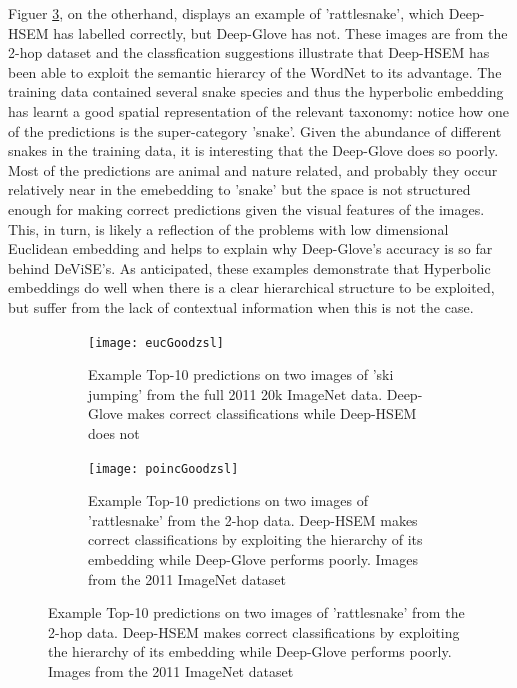\documentclass[12pt]{report}
\begin{document}
Figuer \ref{fig:poincgoodzsl}, on the otherhand, displays an example of 'rattlesnake', which Deep-HSEM has labelled correctly, but Deep-Glove has not. These images are from the 2-hop dataset and the classfication suggestions illustrate that Deep-HSEM has been able to exploit the semantic hierarcy of the WordNet to its advantage. The training data contained several snake species and thus the hyperbolic embedding has learnt a good spatial representation of the relevant taxonomy: notice how one of the predictions is the super-category 'snake'. Given the abundance of different snakes in the training data, it is interesting that the Deep-Glove does so poorly. Most of the predictions are animal and nature related, and probably they occur relatively near in the emebedding to 'snake' but the space is not structured enough for making correct predictions given the visual features of the images. This, in turn, is likely a reflection of the problems with low dimensional Euclidean embedding and helps to explain why Deep-Glove's accuracy is so far behind DeViSE's. As anticipated, these examples demonstrate that Hyperbolic embeddings do well when there is a clear hierarchical structure to be exploited, but suffer from the lack of contextual information when this is not the case.

\begin{figure}
  \centering
  \begin{subfigure}[b]{0.9\textwidth}
  \texttt{[image: eucGoodzsl]}
  \caption{Example Top-10 predictions on two images of 'ski jumping' from the full 2011 20k ImageNet data. Deep-Glove makes correct classifications while Deep-HSEM does not}
  \label{fig:eucgoodzsl}
\end{subfigure}

\begin{subfigure}[b]{0.9\textwidth}
  \texttt{[image: poincGoodzsl]}
  \caption{Example Top-10 predictions on two images of 'rattlesnake' from the 2-hop data. Deep-HSEM makes correct classifications by exploiting the hierarchy of its embedding while Deep-Glove performs poorly. Images from the 2011 ImageNet dataset \cite{JiaDeng2009}}
  \label{fig:poincgoodzsl}
\end{subfigure}
\end{figure}
\end{document}
